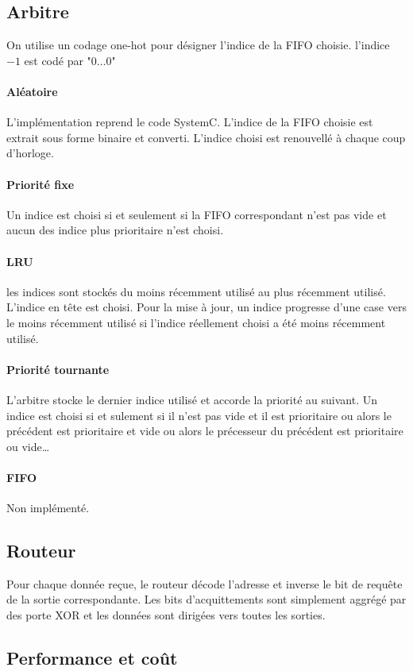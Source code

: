 \documentclass[11pt]{article}
\begin{document}
\subsection{Arbitre}
On utilise un codage one-hot pour désigner l'indice de la FIFO choisie. l'indice $-1$ est codé par "$0\dots0$"
\paragraph{Aléatoire}
L'implémentation reprend le code SystemC. L'indice de la FIFO choisie est extrait sous forme binaire et converti. L'indice choisi est renouvellé à chaque coup d'horloge.
\paragraph{Priorité fixe}
Un indice est choisi si et seulement si la FIFO correspondant n'est pas vide et aucun des indice plus prioritaire n'est choisi.
\paragraph{LRU}
les indices sont stockés du moins récemment utilisé au plus récemment utilisé. L'indice en tête est choisi. Pour la mise à jour, un indice progresse d'une case vers le moins récemment utilisé si l'indice réellement choisi a été moins récemment utilisé.
\paragraph{Priorité tournante}
L'arbitre stocke le dernier indice utilisé et accorde la priorité au suivant. Un indice est choisi si et sulement si il n'est pas vide et il est prioritaire ou alors le précédent est prioritaire et vide ou alors le précesseur du précédent est prioritaire ou vide\ldots
\paragraph{FIFO} Non implémenté.


\subsection{Routeur}

Pour chaque donnée reçue, le routeur décode l'adresse et inverse le bit de requête de la sortie correspondante. Les bits d'acquittements sont simplement aggrégé par des porte XOR et les données sont dirigées vers toutes les sorties.

\subsection{Performance et coût}
\end{document}

